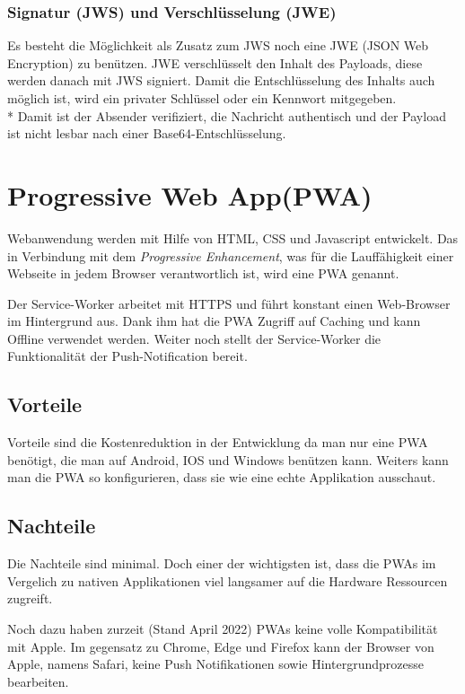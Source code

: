 \subsubsection{Signatur (JWS) und Verschlüsselung (JWE)}
Es besteht die Möglichkeit als Zusatz zum JWS noch eine JWE (JSON Web Encryption) zu benützen. JWE verschlüsselt den Inhalt des Payloads, diese werden danach mit JWS signiert.
Damit die Entschlüsselung des Inhalts auch möglich ist, wird ein privater Schlüssel oder ein Kennwort mitgegeben. \\*
Damit ist der Absender verifiziert, die Nachricht authentisch und der Payload ist nicht lesbar nach einer Base64-Entschlüsselung. \cite{JWTIONOS}


\section{Progressive Web App(PWA)}
\author{Bozidar Spasenovic}
Webanwendung werden mit Hilfe von HTML, CSS und Javascript entwickelt. 
Das in Verbindung mit dem \textit{Progressive Enhancement}, was für die Lauffähigkeit einer Webseite in jedem Browser verantwortlich ist, wird eine PWA genannt. 

Der Service-Worker arbeitet mit HTTPS und führt konstant einen Web-Browser im Hintergrund aus.
Dank ihm hat die PWA Zugriff auf Caching und kann Offline verwendet werden. 
Weiter noch stellt der Service-Worker die Funktionalität der Push-Notification bereit.  

\subsection{Vorteile}
Vorteile sind die Kostenreduktion in der Entwicklung da man nur eine PWA benötigt, die man auf Android, IOS und Windows benützen kann.
Weiters kann man die PWA so konfigurieren, dass sie wie eine echte Applikation ausschaut.

\subsection{Nachteile}
Die Nachteile sind minimal. Doch einer der wichtigsten ist, dass die PWAs im Vergelich zu nativen Applikationen viel langsamer auf die
Hardware Ressourcen zugreift. 

Noch dazu haben zurzeit (Stand April 2022) PWAs keine volle Kompatibilität mit Apple. Im gegensatz zu Chrome, Edge und Firefox
kann der Browser von Apple, namens Safari, keine Push Notifikationen sowie Hintergrundprozesse bearbeiten.

